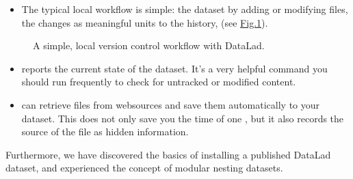 \begin{itemize}
\item {} 
\sphinxAtStartPar
The typical local workflow is simple:  the dataset by adding or
modifying files,  the changes as meaningful units to the history,
 (see \hyperref[\detokenize{basics/101-107-summary:fig-simple-workflow}]{Fig.\@ \ref{\detokenize{basics/101-107-summary:fig-simple-workflow}}}).

\end{itemize}

\begin{figure}[tbp]
\centering
\capstart

\noindent{}
\caption{A simple, local version control workflow with DataLad.}\label{\detokenize{basics/101-107-summary:id1}}\label{\detokenize{basics/101-107-summary:fig-simple-workflow}}\end{figure}
\begin{itemize}
\item {} 
\sphinxAtStartPar
{} reports the current state of the dataset. It’s a very helpful command you should
run frequently to check for untracked or modified content.

\item {} 
\sphinxAtStartPar
{} can retrieve files from websources and save them
automatically to your dataset. This does not only save you the time of one
, but it also records the source of the file as hidden
{\hyperref[\detokenize{glossary:term-provenance}]{}} information.

\end{itemize}

\sphinxAtStartPar
Furthermore, we have discovered the basics of installing a published DataLad dataset,
and experienced the concept of modular nesting datasets.

